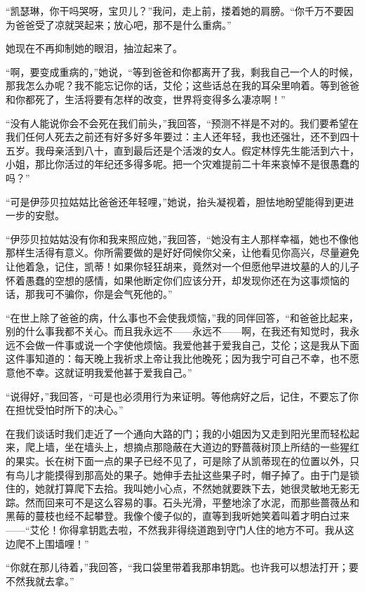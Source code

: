 \par “凯瑟琳，你干吗哭呀，宝贝儿？”我问，走上前，搂着她的肩膀。“你千万不要因为爸爸受了凉就哭起来；放心吧，那不是什么重病。”
\par 她现在不再抑制她的眼泪，抽泣起来了。
\par “啊，要变成重病的，”她说，“等到爸爸和你都离开了我，剩我自己一个人的时候，那我怎么办呢？我不能忘记你的话，艾伦；这些话总在我的耳朵里响着。等到爸爸和你都死了，生活将要有怎样的改变，世界将变得多么凄凉啊！”
\par “没有人能说你会不会死在我们前头，”我回答，“预测不祥是不对的。我们要希望在我们任何人死去之前还有好多好多年要过：主人还年轻，我也还强壮，还不到四十五岁。我母亲活到八十，直到最后还是个活泼的女人。假定林惇先生能活到六十，小姐，那比你活过的年纪还多得多呢。把一个灾难提前二十年来哀悼不是很愚蠢的吗？”
\par “可是伊莎贝拉姑姑比爸爸还年轻哩，”她说，抬头凝视着，胆怯地盼望能得到更进一步的安慰。
\par “伊莎贝拉姑姑没有你和我来照应她，”我回答，“她没有主人那样幸福，她也不像他那样生活得有意义。你所需要做的是好好伺候你父亲，让他看见你高兴，尽量避免让他着急，记住，凯蒂！如果你轻狂胡来，竟然对一个但愿他早进坟墓的人的儿子怀着愚蠢的空想的感情，如果他断定你们应该分开，却发现你还在为这事烦恼的话，那我可不骗你，你是会气死他的。”
\par “在世上除了爸爸的病，什么事也不会使我烦恼，”我的同伴回答，“和爸爸比起来，别的什么事我都不关心。而且我永远不——永远不——啊，在我还有知觉时，我永远不会做一件事或说一个字使他烦恼。我爱他甚于爱我自己，艾伦；这是我从下面这件事知道的：每天晚上我祈求上帝让我比他晚死；因为我宁可自己不幸，也不愿意他不幸。这就证明我爱他甚于爱我自己。”
\par “说得好，”我回答，“可是也必须用行为来证明。等他病好之后，记住，不要忘了你在担忧受怕时所下的决心。”
\par 在我们谈话时我们走近了一个通向大路的门；我的小姐因为又走到阳光里而轻松起来，爬上墙，坐在墙头上，想摘点那隐蔽在大道边的野蔷薇树顶上所结的一些猩红的果实。长在树下面一点的果子已经不见了，可是除了从凯蒂现在的位置以外，只有鸟儿才能摸得到那高处的果子。她伸手去扯这些果子时，帽子掉了。由于门是锁住的，她就打算爬下去拾。我叫她小心点，不然她就要跌下去，她很灵敏地无影无踪。然而回来可不是这么容易的事。石头光滑，平整地涂了水泥，而那些蔷薇丛和黑莓的蔓枝也经不起攀登。我像个傻子似的，直等到我听她笑着叫着才明白过来——“艾伦！你得拿钥匙去啦，不然我非得绕道跑到守门人住的地方不可。我从这边爬不上围墙哩！”
\par “你就在那儿待着，”我回答，“我口袋里带着我那串钥匙。也许我可以想法打开；要不然我就去拿。”
